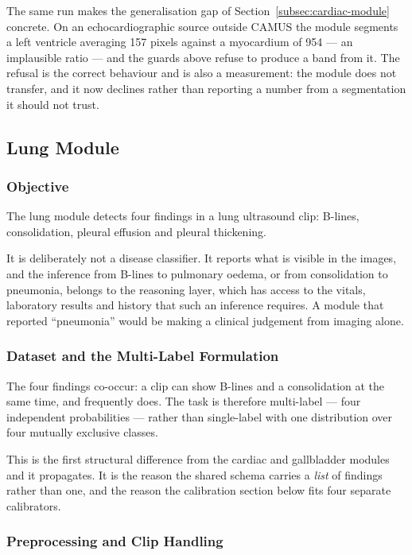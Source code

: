 The same run makes the generalisation gap of Section~\ref{subsec:cardiac-module} concrete. On an
echocardiographic source outside CAMUS the module segments a left ventricle averaging 157 pixels
against a myocardium of 954 --- an implausible ratio --- and the guards above refuse to produce a
band from it. The refusal is the correct behaviour and is also a measurement: the module does not
transfer, and it now declines rather than reporting a number from a segmentation it should not
trust.

\subsection{Lung Module}
\label{subsec:lung-module}

\subsubsection{Objective}

The lung module detects four findings in a lung ultrasound clip: B-lines, consolidation,
pleural effusion and pleural thickening.

It is deliberately not a disease classifier. It reports what is visible in the images, and the
inference from B-lines to pulmonary oedema, or from consolidation to pneumonia, belongs to the
reasoning layer, which has access to the vitals, laboratory results and history that such an
inference requires. A module that reported ``pneumonia'' would be making a clinical judgement
from imaging alone.

\subsubsection{Dataset and the Multi-Label Formulation}

The four findings co-occur: a clip can show B-lines and a consolidation at the same time, and
frequently does. The task is therefore multi-label --- four independent probabilities --- rather
than single-label with one distribution over four mutually exclusive classes.

This is the first structural difference from the cardiac and gallbladder modules and it
propagates. It is the reason the shared schema carries a \emph{list} of findings rather than
one, and the reason the calibration section below fits four separate calibrators.

\subsubsection{Preprocessing and Clip Handling}

